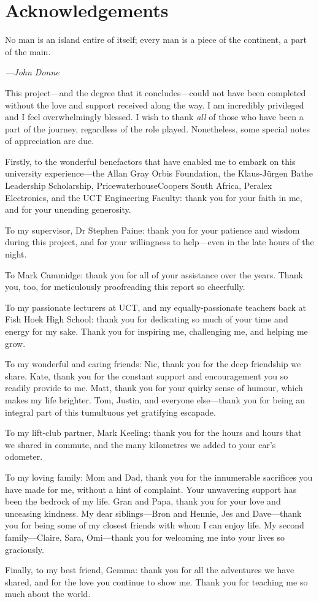 \documentclass[class=report,11pt,crop=false]{standalone}
\begin{document}
\chapter*{Acknowledgements}
\epigraph{No man is an island entire of itself; every man is a piece of the continent, a part of the main.}%
    {\emph{---John Donne}}
\vspace{0.5cm}

This project---and the degree that it concludes---could not have been completed without the love and support received along the way. I am incredibly privileged and I feel overwhelmingly blessed. I wish to thank \emph{all} of those who have been a part of the journey, regardless of the role played. Nonetheless, some special notes of appreciation are due.

Firstly, to the wonderful benefactors that have enabled me to embark on this university experience---the Allan Gray Orbis Foundation, the Klaus-J\"urgen Bathe Leadership Scholarship, PricewaterhouseCoopers South Africa, Peralex Electronics, and the UCT Engineering Faculty: thank you for your faith in me, and for your unending generosity.

To my supervisor, Dr Stephen Paine: thank you for your patience and wisdom during this project, and for your willingness to help---even in the late hours of the night.

To Mark Cammidge: thank you for all of your assistance over the years. Thank you, too, for meticulously proofreading this report so cheerfully.

To my passionate lecturers at UCT, and my equally-passionate teachers back at Fish Hoek High School: thank you for dedicating so much of your time and energy for my sake. Thank you for inspiring me, challenging me, and helping me grow.

To my wonderful and caring friends: Nic, thank you for the deep friendship we share. Kate, thank you for the constant support and encouragement you so readily provide to me. Matt, thank you for your quirky sense of humour, which makes my life brighter. Tom, Justin, and everyone else---thank you for being an integral part of this tumultuous yet gratifying escapade.

To my lift-club partner, Mark Keeling: thank you for the hours and hours that we shared in commute, and the many kilometres we added to your car's odometer.

To my loving family: Mom and Dad, thank you for the innumerable sacrifices you have made for me, without a hint of complaint. Your unwavering support has been the bedrock of my life. Gran and Papa, thank you for your love and unceasing kindness. My dear siblings---Bron and Hennie, Jes and Dave---thank you for being some of my closest friends with whom I can enjoy life. My second family---Claire, Sara, Omi---thank you for welcoming me into your lives so graciously.

Finally, to my best friend, Gemma: thank you for all the adventures we have shared, and for the love you continue to show me. Thank you for teaching me so much about the world.
\end{document}

